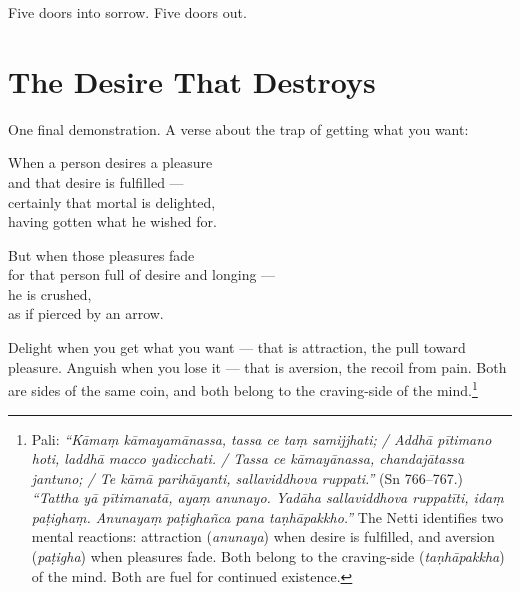 Five doors into sorrow. Five doors out.

\section*{The Desire That Destroys}

One final demonstration. A verse about the trap of getting what you want:

\begin{versebox}
When a person desires a pleasure\\
and that desire is fulfilled ---\\
certainly that mortal is delighted,\\
having gotten what he wished for.

\stanza

But when those pleasures fade\\
for that person full of desire and longing ---\\
he is crushed,\\
as if pierced by an arrow.
\end{versebox}

Delight when you get what you want --- that is attraction, the pull toward pleasure. Anguish when you lose it --- that is aversion, the recoil from pain. Both are sides of the same coin, and both belong to the craving-side of the mind.\footnote{Pali: \textit{``Kāmaṃ kāmayamānassa, tassa ce taṃ samijjhati; / Addhā pītimano hoti, laddhā macco yadicchati. / Tassa ce kāmayānassa, chandajātassa jantuno; / Te kāmā parihāyanti, sallaviddhova ruppati.''} (Sn 766--767.) \textit{``Tattha yā pītimanatā, ayaṃ anunayo. Yadāha sallaviddhova ruppatīti, idaṃ paṭighaṃ. Anunayaṃ paṭighañca pana taṇhāpakkho.''} The Netti identifies two mental reactions: attraction (\textit{anunaya}) when desire is fulfilled, and aversion (\textit{paṭigha}) when pleasures fade. Both belong to the craving-side (\textit{taṇhāpakkha}) of the mind. Both are fuel for continued existence.}

